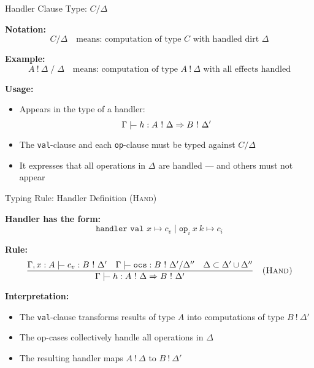 \begin{frame}{Handler Clause Type: \( C / \Delta \)}

\textbf{Notation:}
\[
C / \Delta
\quad \text{means: computation of type } C \text{ with handled dirt } \Delta
\]

\vspace{1em}

\textbf{Example:}
\[
A\ !\ \Delta \;/\; \Delta
\quad \text{means: computation of type } A\ !\ \Delta \text{ with all effects handled}
\]

\vspace{1em}

\textbf{Usage:}
\begin{itemize}
  \item Appears in the type of a handler:
  \[
  \Gamma \tvdash h : A\ !\ \Delta \Rightarrow B\ !\ \Delta'
  \]
  \item The \texttt{val}-clause and each \texttt{op}-clause must be typed against \( C / \Delta \)
  \item It expresses that all operations in \( \Delta \) are handled — and others must not appear
\end{itemize}

\end{frame}

\begin{frame}{Typing Rule: Handler Definition (\textsc{Hand})}

\textbf{Handler has the form:}
\[
\texttt{handler val } x \mapsto c_v \mid \texttt{op}_i\ x\ k \mapsto c_i
\]

\textbf{Rule:}
\[
\frac{
  \Gamma, x : A \tvdash c_v : B\ !\ \Delta'
  \quad
  \Gamma \tvdash \texttt{ocs} : B\ !\ \Delta' / \Delta'' 
  \quad \Delta \subset \Delta' \cup \Delta''
}{
  \Gamma \tvdash h : A\ !\ \Delta \Rightarrow B\ !\ \Delta'
}
\quad\textsc{(Hand)}
\]

\vspace{1em}

\textbf{Interpretation:}
\begin{itemize}
  \item The \texttt{val}-clause transforms results of type \( A \) into computations of type \( B\ !\ \Delta' \)
  \item The op-cases collectively handle all operations in \( \Delta \)
  \item The resulting handler maps \( A\ !\ \Delta \) to \( B\ !\ \Delta' \)
\end{itemize}

\end{frame}

